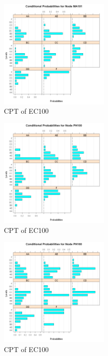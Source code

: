 \documentclass[15pt,journal]{IEEEtran}
\begin{document}
\begin{figure}[H]%
\begin {center}
\includegraphics[width=0.48\textwidth]{images/MA101.png}

\caption{CPT of EC100} %
\label{fig:ecg}
\end {center}
\end{figure}

\begin{figure}[H]%
\begin {center}
\includegraphics[width=0.48\textwidth]{images/PH100.png}
\caption{CPT of EC100} %
\label{fig:ecg}
\end {center}
\end{figure}

\begin{figure}[H]%
\begin {center}
\includegraphics[width=0.48\textwidth]{images/PH160.png}
\caption{CPT of EC100} %
\label{fig:ecg}
\end {center}
\end{figure}
\end{document}
